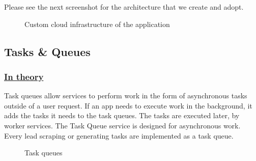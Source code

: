Please see the next screenshot for the architecture that we create and adopt.
\begin{figure}[H]
	\centering
	\caption{Custom cloud infrastructure of the application}
	\label{fig:cloud-infrastructure}
\end{figure}

\subsection{Tasks \& Queues}

\subsubsection*{\underline{In theory}}
Task queues allow services to perform work in the form of asynchronous tasks outside of a user request.
If an app needs to execute work in the background, it adds the tasks it needs to the task queues. The tasks are executed later, by worker services. The Task Queue service is designed for asynchronous work.
Every lead scraping or generating tasks are implemented as a task queue.
\begin{figure}[H]
	\centering
	\caption{Task queues}
	\label{fig:task-queue}
\end{figure}

